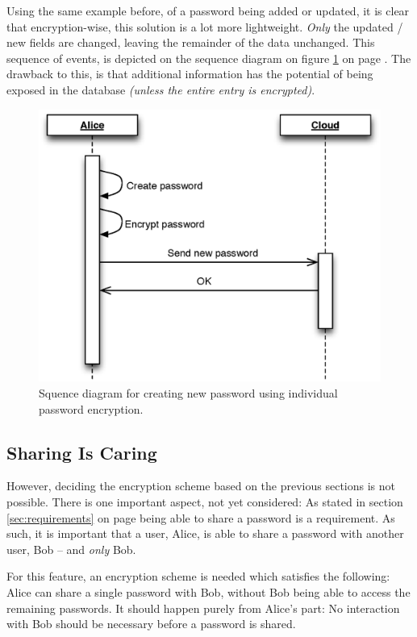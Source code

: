 			Using the same example before, of a password being added or updated, it is clear that encryption-wise, this solution is a lot more lightweight. \emph{Only} the updated / new fields are changed, leaving the remainder of the data unchanged. This sequence of events, is depicted on the sequence diagram on figure \ref{fig:seq_perentry} on page \pageref{fig:seq_perentry}. The drawback to this, is that additional information has the potential of being exposed in the database \emph{(unless the entire entry is encrypted)}.


			\begin{figure}[h!]
				\centering
				\includegraphics[width=\textwidth]{figures/design/uml/sequence/individual.eps}
				\caption{Squence diagram for creating new password using individual password encryption.}
				\label{fig:seq_perentry}
			\end{figure}

		\subsection{Sharing Is Caring}
			\label{sec:share}
			However, deciding the encryption scheme based on the previous sections is not possible. There is one important aspect, not yet considered: As stated in section \ref{sec:requirements} on page \pageref{sec:requirements} being able to share a password is a requirement. As such, it is important that a user, Alice, is able to share a password with another user, Bob -- and \emph{only} Bob.

			For this feature, an encryption scheme is needed which satisfies the following: Alice can share a single password with Bob, without Bob being able to access the remaining passwords. It should happen purely from Alice's part: No interaction with Bob should be necessary before a password is shared.


